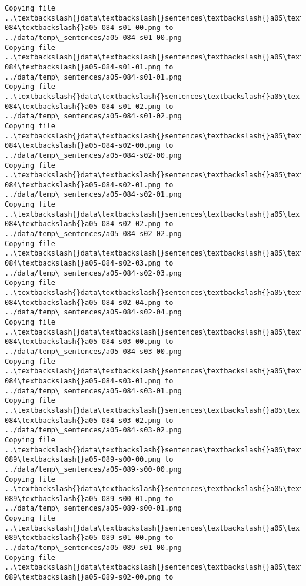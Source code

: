 \documentclass[11pt]{article}
\begin{document}
\begin{Verbatim}[commandchars=\\\{\}]
Copying file ..\textbackslash{}data\textbackslash{}sentences\textbackslash{}a05\textbackslash{}a05-084\textbackslash{}a05-084-s01-00.png to
../data/temp\_sentences/a05-084-s01-00.png
Copying file ..\textbackslash{}data\textbackslash{}sentences\textbackslash{}a05\textbackslash{}a05-084\textbackslash{}a05-084-s01-01.png to
../data/temp\_sentences/a05-084-s01-01.png
Copying file ..\textbackslash{}data\textbackslash{}sentences\textbackslash{}a05\textbackslash{}a05-084\textbackslash{}a05-084-s01-02.png to
../data/temp\_sentences/a05-084-s01-02.png
Copying file ..\textbackslash{}data\textbackslash{}sentences\textbackslash{}a05\textbackslash{}a05-084\textbackslash{}a05-084-s02-00.png to
../data/temp\_sentences/a05-084-s02-00.png
Copying file ..\textbackslash{}data\textbackslash{}sentences\textbackslash{}a05\textbackslash{}a05-084\textbackslash{}a05-084-s02-01.png to
../data/temp\_sentences/a05-084-s02-01.png
Copying file ..\textbackslash{}data\textbackslash{}sentences\textbackslash{}a05\textbackslash{}a05-084\textbackslash{}a05-084-s02-02.png to
../data/temp\_sentences/a05-084-s02-02.png
Copying file ..\textbackslash{}data\textbackslash{}sentences\textbackslash{}a05\textbackslash{}a05-084\textbackslash{}a05-084-s02-03.png to
../data/temp\_sentences/a05-084-s02-03.png
Copying file ..\textbackslash{}data\textbackslash{}sentences\textbackslash{}a05\textbackslash{}a05-084\textbackslash{}a05-084-s02-04.png to
../data/temp\_sentences/a05-084-s02-04.png
Copying file ..\textbackslash{}data\textbackslash{}sentences\textbackslash{}a05\textbackslash{}a05-084\textbackslash{}a05-084-s03-00.png to
../data/temp\_sentences/a05-084-s03-00.png
Copying file ..\textbackslash{}data\textbackslash{}sentences\textbackslash{}a05\textbackslash{}a05-084\textbackslash{}a05-084-s03-01.png to
../data/temp\_sentences/a05-084-s03-01.png
Copying file ..\textbackslash{}data\textbackslash{}sentences\textbackslash{}a05\textbackslash{}a05-084\textbackslash{}a05-084-s03-02.png to
../data/temp\_sentences/a05-084-s03-02.png
Copying file ..\textbackslash{}data\textbackslash{}sentences\textbackslash{}a05\textbackslash{}a05-089\textbackslash{}a05-089-s00-00.png to
../data/temp\_sentences/a05-089-s00-00.png
Copying file ..\textbackslash{}data\textbackslash{}sentences\textbackslash{}a05\textbackslash{}a05-089\textbackslash{}a05-089-s00-01.png to
../data/temp\_sentences/a05-089-s00-01.png
Copying file ..\textbackslash{}data\textbackslash{}sentences\textbackslash{}a05\textbackslash{}a05-089\textbackslash{}a05-089-s01-00.png to
../data/temp\_sentences/a05-089-s01-00.png
Copying file ..\textbackslash{}data\textbackslash{}sentences\textbackslash{}a05\textbackslash{}a05-089\textbackslash{}a05-089-s02-00.png to

\end{Verbatim}
\end{document}
